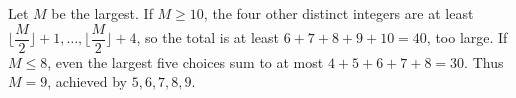 Let $M$ be the largest. If $M\ge10$, the four other distinct integers are at least $\lfloor \dfrac{M}{2}\rfloor+1,\ldots,\lfloor \dfrac{M}{2}\rfloor+4$, so the total is at least $6+7+8+9+10=40$, too large. If $M\le8$, even the largest five choices sum to at most $4+5+6+7+8=30$. Thus $M=\boxed{9}$, achieved by $5,6,7,8,9$.
